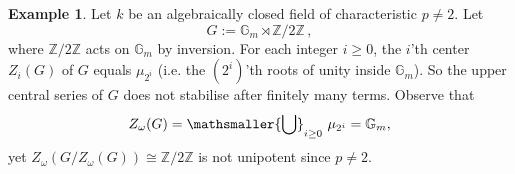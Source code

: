 \documentclass[twoside,a4paper,reqno,11pt]{amsart}
\theoremstyle{definition}
\newtheorem{example}[theorem]{Example}
\begin{document}
\begin{example}\label{etaleunion} Let $k$ be an algebraically closed field of characteristic $p\neq 2$. Let $$G:=\mathbb{G}_m\rtimes\mathbb{Z}/2\mathbb{Z}\, ,$$ where $\mathbb{Z}/2\mathbb{Z}$ acts on $\mathbb{G}_m$ by inversion. For each integer $i\geq 0$, the $i$'th center $Z_i(G)$ of $G$ equals $\mu_{2^i}$ (i.e. the $(2^i)$'th roots of unity inside $\mathbb{G}_m$). %
So the upper central series of $G$ does not stabilise after finitely many terms. %
Observe that $$Z_\omega(G)=\mathsmaller{\bigcup}_{i\geq 0}\,\,\mu_{2^i}=\mathbb{G}_m,$$ yet $Z_{\omega}(G/Z_\omega(G))\cong\mathbb{Z}/2\mathbb{Z}$ is not unipotent since $p\neq 2$. %


\end{example}
\end{document}

